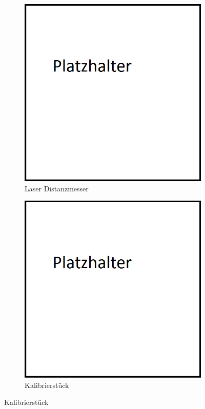 \begin{figure}[h!]
         \centering
         \caption[Kalibrierwerkzeuge]{Werkzeuge die bei der Kalibrierung verwendet werden.}
         \begin{subfigure}[h]{0.4\textwidth}
                 \centering
                 \includegraphics[width=\textwidth]{img/00_placeholder-sqare.png}
                 \caption{Laser Distanzmesser}
                 \label{fig:laser_meter}
         \end{subfigure}
%
\qquad         
%
         \begin{subfigure}[h]{0.4\textwidth}
                 \centering
                 \includegraphics[width=\textwidth]{img/00_placeholder-sqare.png}
                 \caption{Kalibrierstück}
                 \label{fig:calib_piece}
         \end{subfigure}
         \label{fig:Calibration_Tools}
\end{figure}
 